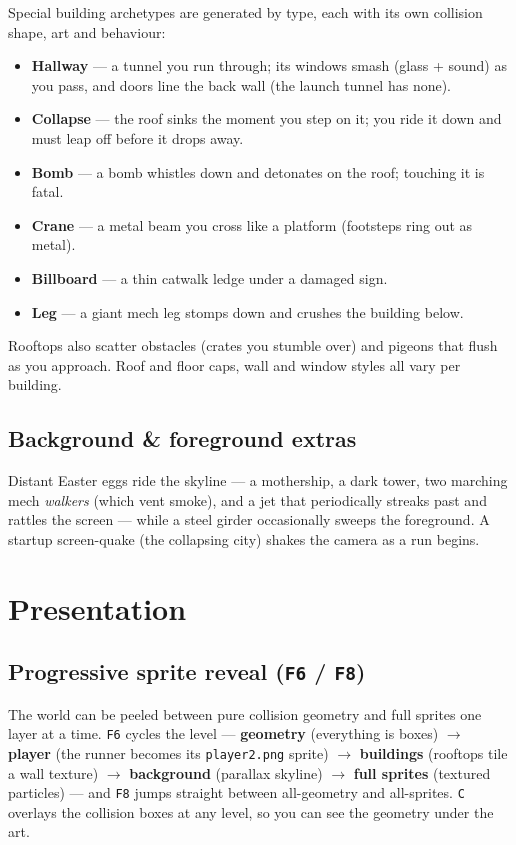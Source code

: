 \documentclass[11pt]{report}
\newcommand{\code}[1]{\texttt{#1}}
\begin{document}
Special building archetypes are generated by type, each with its own collision
shape, art and behaviour:
\begin{itemize}[nosep]
  \item \textbf{Hallway} --- a tunnel you run through; its windows smash (glass +
        sound) as you pass, and doors line the back wall (the launch tunnel has none).
  \item \textbf{Collapse} --- the roof sinks the moment you step on it; you ride it
        down and must leap off before it drops away.
  \item \textbf{Bomb} --- a bomb whistles down and detonates on the roof; touching
        it is fatal.
  \item \textbf{Crane} --- a metal beam you cross like a platform (footsteps ring
        out as metal).
  \item \textbf{Billboard} --- a thin catwalk ledge under a damaged sign.
  \item \textbf{Leg} --- a giant mech leg stomps down and crushes the building below.
\end{itemize}
Rooftops also scatter obstacles (crates you stumble over) and pigeons that flush as
you approach. Roof and floor caps, wall and window styles all vary per building.

\section{Background \& foreground extras}
Distant Easter eggs ride the skyline --- a mothership, a dark tower, two marching
mech \emph{walkers} (which vent smoke), and a jet that periodically streaks past
and rattles the screen --- while a steel girder occasionally sweeps the foreground.
A startup screen-quake (the collapsing city) shakes the camera as a run begins.

\chapter{Presentation}
\section{Progressive sprite reveal (\code{F6} / \code{F8})}
The world can be peeled between pure collision geometry and full sprites one layer
at a time. \code{F6} cycles the level --- \textbf{geometry} (everything is boxes)
$\to$ \textbf{player} (the runner becomes its \code{player2.png} sprite) $\to$
\textbf{buildings} (rooftops tile a wall texture) $\to$ \textbf{background}
(parallax skyline) $\to$ \textbf{full sprites} (textured particles) --- and
\code{F8} jumps straight between all-geometry and all-sprites. \code{C} overlays
the collision boxes at any level, so you can see the geometry under the art.
\end{document}
